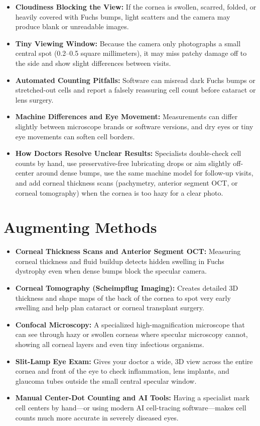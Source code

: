 \begin{itemize}
    \item \textbf{Cloudiness Blocking the View:} If the cornea is swollen, scarred, folded, or heavily covered with Fuchs bumps, light scatters and the camera may produce blank or unreadable images.
    \item \textbf{Tiny Viewing Window:} Because the camera only photographs a small central spot (0.2--0.5 square millimeters), it may miss patchy damage off to the side and show slight differences between visits.
    \item \textbf{Automated Counting Pitfalls:} Software can misread dark Fuchs bumps or stretched-out cells and report a falsely reassuring cell count before cataract or lens surgery.
    \item \textbf{Machine Differences and Eye Movement:} Measurements can differ slightly between microscope brands or software versions, and dry eyes or tiny eye movements can soften cell borders.
    \item \textbf{How Doctors Resolve Unclear Results:} Specialists double-check cell counts by hand, use preservative-free lubricating drops or aim slightly off-center around dense bumps, use the same machine model for follow-up visits, and add corneal thickness scans (pachymetry, anterior segment OCT, or corneal tomography) when the cornea is too hazy for a clear photo.
\end{itemize}

\section{Augmenting Methods}

\begin{itemize}
    \item \textbf{Corneal Thickness Scans and Anterior Segment OCT:} Measuring corneal thickness and fluid buildup detects hidden swelling in Fuchs dystrophy even when dense bumps block the specular camera.
    \item \textbf{Corneal Tomography (Scheimpflug Imaging):} Creates detailed 3D thickness and shape maps of the back of the cornea to spot very early swelling and help plan cataract or corneal transplant surgery.
    \item \textbf{Confocal Microscopy:} A specialized high-magnification microscope that can see through hazy or swollen corneas where specular microscopy cannot, showing all corneal layers and even tiny infectious organisms.
    \item \textbf{Slit-Lamp Eye Exam:} Gives your doctor a wide, 3D view across the entire cornea and front of the eye to check inflammation, lens implants, and glaucoma tubes outside the small central specular window.
    \item \textbf{Manual Center-Dot Counting and AI Tools:} Having a specialist mark cell centers by hand---or using modern AI cell-tracing software---makes cell counts much more accurate in severely diseased eyes.
\end{itemize}

